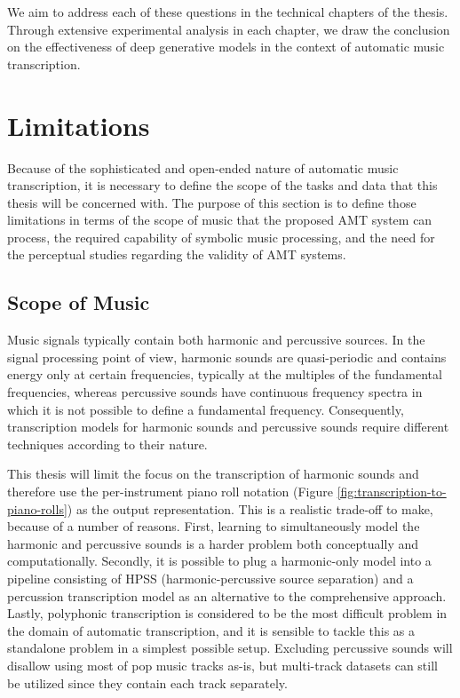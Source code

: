 We aim to address each of these questions in the technical chapters of the thesis.
Through extensive experimental analysis in each chapter, we draw the conclusion on the effectiveness of deep generative models in the context of automatic music transcription.


\section{Limitations}\label{sec:limitations}

Because of the sophisticated and open-ended nature of automatic music transcription, it is necessary to define the scope of the tasks and data that this thesis will be concerned with.
The purpose of this section is to define those limitations in terms of the scope of music that the proposed AMT system can process, the required capability of symbolic music processing, and the need for the perceptual studies regarding the validity of AMT systems.


\subsection{Scope of Music}

Music signals typically contain both harmonic and percussive sources. 
In the signal processing point of view, harmonic sounds are quasi-periodic and contains energy only at certain frequencies, typically at the multiples of the fundamental frequencies, whereas percussive sounds have continuous frequency spectra in which it is not possible to define a fundamental frequency.
Consequently, transcription models for harmonic sounds and percussive sounds require different techniques according to their nature.


This thesis will limit the focus on the transcription of harmonic sounds and therefore use the per-instrument piano roll notation (Figure \ref{fig:transcription-to-piano-rolls}) as the output representation.
This is a realistic trade-off to make, because of a number of reasons.
First, learning to simultaneously model the harmonic and percussive sounds is a harder problem both conceptually and computationally.
Secondly, it is possible to plug a harmonic-only model into a pipeline consisting of HPSS (harmonic-percussive source separation) and a percussion transcription model as an alternative to the comprehensive approach.
Lastly, polyphonic transcription is considered to be the most difficult problem in the domain of automatic transcription, and it is sensible to tackle this as a standalone problem in a simplest possible setup.
Excluding percussive sounds will disallow using most of pop music tracks as-is, but multi-track datasets can still be utilized since they contain each track separately.


